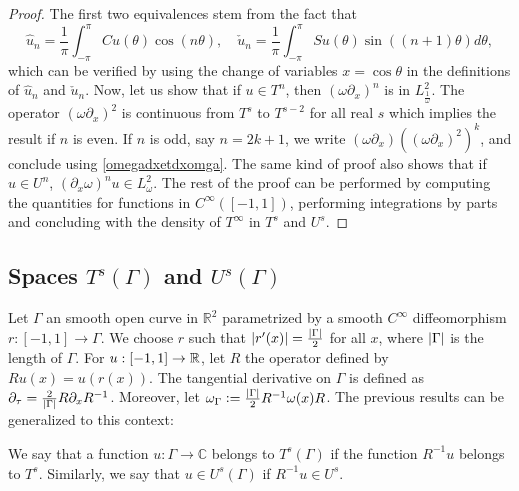 \documentclass[a4paper]{article}
\begin{document}
\begin{proof}
	The first two equivalences stem from the fact that 
	\[\hat{u}_n = \frac{1}{\pi}\int_{-\pi}^{\pi} Cu(\theta) \cos(n \theta), \quad  \check{u}_n = \frac{1}{\pi} \int_{-\pi}^{\pi} Su(\theta) \sin((n+1)\theta)d\theta,\]
	which can be verified by using the change of variables $x = \cos\theta$ in the definitions of $\hat{u}_n$ and $\check{u}_n$. 
	Now, let us show that if $ u \in T^n$, then $(\omega \partial_x)^n$ is in $L^2_\frac{1}{\omega}$. The operator $(\omega \partial_x)^2$ is continuous from $T^s$ to $T^{s-2}$ for all real $s$ which implies the result if $n$ is even. If $n$ is odd, say $n = 2k + 1$, we write $(\omega \partial_x)((\omega \partial_x)^{2})^k$, and conclude using \autoref{omegadxetdxomga}.
	The same kind of proof also shows that if $u \in U^n$, $(\partial_x \omega )^nu \in L^2_\omega$.
	The rest of the proof can be performed by computing the quantities for functions in $C^{\infty}([-1,1])$, performing integrations by parts and concluding with the density of $T^{\infty}$ in $T^s$ and $U^s$. 
\end{proof}
\subsection{Spaces $T^s(\Gamma)$ and $U^s(\Gamma)$}

Let $\Gamma$ an smooth open curve in $\mathbb{R}^2$ parametrized by a smooth $C^\infty$ diffeomorphism $r : [-1,1] \to \Gamma$. We choose $r$ such that $\left\lvert r'(x) \right\rvert = \frac{\left\lvert \Gamma \right\rvert}{2}$ for all $x$, where $\left\lvert \Gamma \right\rvert$ is the length of $\Gamma$. For $u : [-1,1] \to \mathbb{R}$, let $R$ the operator defined by $Ru(x) = u(r(x))$. The tangential derivative on $\Gamma$ is defined as $\partial_\tau = \frac{2}{\left\lvert \Gamma \right\rvert}R\partial_x R^{-1}$. Moreover, let $\omega_\Gamma \mathrel{\mathop:}= \frac{\left\lvert \Gamma \right\rvert}{2} R^{-1}  \omega(x) R$. The previous results can be generalized to this context:

\begin{Def}
	We say that a function $u : \Gamma \to \mathbb{C}$ belongs to $T^s(\Gamma)$ if the function $R^{-1}u$ belongs to $T^s$. Similarly, we say that $u \in U^s(\Gamma)$ if $R^{-1}u \in U^s$. 
\end{Def}
\end{document}
